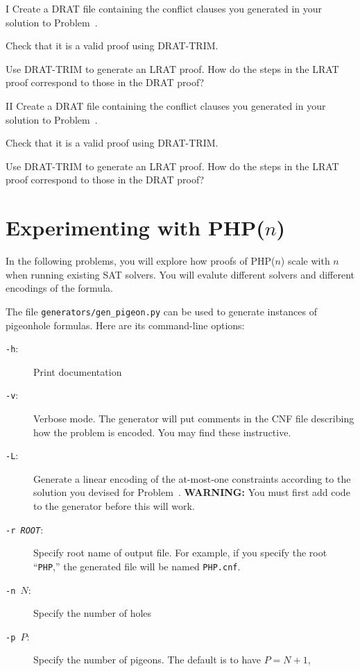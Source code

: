 \begin{problem}{I}
Create a DRAT file containing the conflict clauses you generated in your solution to Problem~.
\begin{choice}
\item
Check that it is a valid proof using DRAT-TRIM.
\item
Use DRAT-TRIM to generate an LRAT proof.  How do the steps in the LRAT proof correspond to those in the DRAT proof?
\end{choice}
\end{problem}

\begin{problem}{II}
Create a DRAT file containing the conflict clauses you generated in your solution to Problem~.
\begin{choice}
\item
Check that it is a valid proof using DRAT-TRIM.
\item
Use DRAT-TRIM to generate an LRAT proof.  How do the steps in the LRAT proof correspond to those in the DRAT proof?
\end{choice}
\end{problem}

\newpage

\section*{Experimenting with PHP($n$)}

In the following problems, you will explore how proofs of PHP($n$)
scale with $n$ when running existing SAT solvers.  You will evalute
different solvers and different encodings of the formula.

The file \texttt{generators/gen\_pigeon.py} can be used to generate
instances of pigeonhole formulas.  Here are its command-line options:
\begin{description}
\item[\texttt{-h}:] Print documentation
\item[\texttt{-v}:] Verbose mode.
  The generator will put comments in
  the CNF file describing how the problem is encoded.  You may find
  these instructive.
\item[\texttt{-L}:] Generate a linear encoding of the at-most-one
  constraints according to the solution you devised for
  Problem~.  {\bf WARNING:} You must first add code
  to the generator before this will work.
\item[\texttt{-r \textit{ROOT}}:]
  Specify root name of output file.  For example, if you specify the
  root ``\texttt{PHP},'' the generated file will be named
  \texttt{PHP.cnf}.
\item[\texttt{-n $N$}:]
  Specify the number of holes
\item[\texttt{-p $P$}:]
  Specify the number of pigeons.  The default is to have $P=N+1$,
\end{description}


